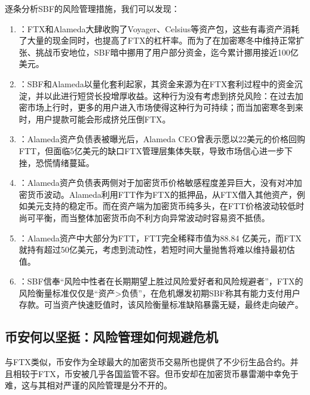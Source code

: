 逐条分析SBF的风险管理措施，我们可以发现：
\begin{enumerate}
    \item \textbf{}：FTX和Alameda大肆收购了Voyager、Celsius等资产包，这些有毒资产消耗了大量的现金同时，也提高了FTX的杠杆率。而为了在加密寒冬中维持正常扩张、挑战币安地位，SBF暗中挪用了用户部分资金，迄今累计挪用接近100亿美元。
    \item \textbf{}：SBF和Alameda以量化套利起家，其资金来源为在FTX套利过程中的资金沉淀，并以此进行短贷长投增厚收益。这种行为没有考虑到挤兑风险：在过去加密市场上行时，更多的用户进入市场使得这种行为可持续；而当加密寒冬到来时，用户提款可能会形成挤兑压倒FTX。
    \item \textbf{}：Alameda资产负债表被曝光后，Alameda CEO曾表示愿以22美元的价格回购FTT，但面临5亿美元的缺口FTX管理层集体失联，导致市场信心进一步下挫，恐慌情绪蔓延。
    \item \textbf{}：Alameda资产负债表两侧对于加密货币价格敏感程度差异巨大，没有对冲加密货币波动。Alameda利用FTT作为FTX的抵押品，从FTX借入其他资产，例如美元支持的稳定币。而在资产端为加密货币纯多头，在FTT价格波动较低时尚可平衡，而当整体加密货币向不利方向异常波动时容易资不抵债。
    \item \textbf{}：Alameda资产中大部分为FTT，FTT完全稀释市值为88.84 亿美元，而FTX就持有超过50亿美元，考虑到流动性，若短时间大量抛售将难以维持最初估值。
    \item \textbf{}：SBF信奉“风险中性者在长期期望上胜过风险爱好者和风险规避者”，FTX的风险衡量标准仅仅是“资产>负债”，在危机爆发初期SBF称其有能力支付用户存款。可当资产快速贬值时，该风险衡量标准缺陷暴露无疑，最终走向破产。
\end{enumerate}


\subsection{币安何以坚挺：风险管理如何规避危机}
与FTX类似，币安作为全球最大的加密货币交易所也提供了不少衍生品合约。并且相较于FTX，币安被几乎各国监管不容。但币安却在加密货币暴雷潮中幸免于难，这与其相对严谨的风险管理是分不开的。


